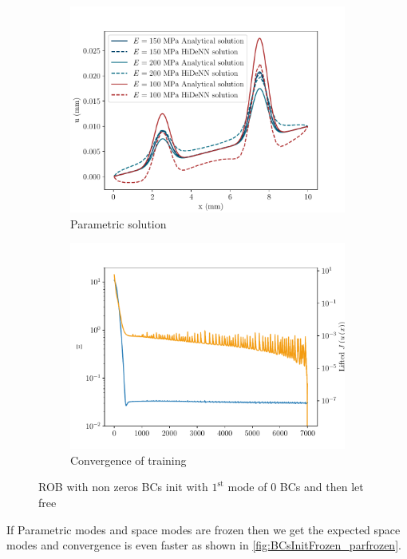 \begin{figure}
\begin{subfigure}[t]{0.5\linewidth}
    \includegraphics[width=\linewidth]{Figures/Para_displacementsROM_1Para_np_50_order_1_nmodes_1_npara_1BCs_init_free.pdf}
    \caption{Parametric solution}
\end{subfigure} 
  \begin{subfigure}[t]{0.5\linewidth}
    \centering
    \includegraphics[width=\linewidth]{Figures/Non0BCs_init_free.pdf}
    \caption{Convergence of training}
\end{subfigure} 
\caption{ROB with non zeros BCs init with $1^{\text{st}}$ mode of $0$ BCs and then let free}
    \label{fig:BCsInitFree}
\end{figure}


If Parametric modes and space modes are frozen then we get the expected space modes and convergence is even faster as shown in \ref{fig:BCsInitFrozen_parfrozen}.

